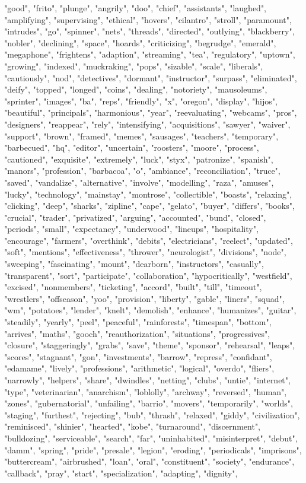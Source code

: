 "good", "frito", "plunge", "angrily", "doo", "chief", "assistants", "laughed", "amplifying", "supervising", "ethical", "hovers", "cilantro", "stroll", "paramount", "intrudes", "go", "spinner", "nets", "threads", "directed", "outlying", "blackberry", "nobler", "declining", "space", "hoards", "criticizing", "begrudge", "emerald", "megaphone", "frightens", "adaption", "streaming", "tea", "regulatory", "uptown", "growing", "indexed", "muckraking", "pops", "sizable", "scale", "liberals", "cautiously", "nod", "detectives", "dormant", "instructor", "surpass", "eliminated", "deify", "topped", "longed", "coins", "dealing", "notoriety", "mausoleums", "sprinter", "images", "ba", "reps", "friendly", "x", "oregon", "display", "hijos", "beautiful", "principals", "harmonious", "year", "reevaluating", "webcams", "pros", "designers", "reappear", "rely", "intensifying", "acquisitions", "sawyer", "waiver", "support", "brown", "framed", "memes", "sausages", "teachers", "temporary", "barbecued", "hq", "editor", "uncertain", "roosters", "moore", "process", "cautioned", "exquisite", "extremely", "luck", "styx", "patronize", "spanish", "manors", "profession", "barbacoa", "o", "ambiance", "reconciliation", "truce", "saved", "vandalize", "alternative", "involve", "modelling", "raza", "amuses", "lucky", "technology", "mainstay", "montrose", "collectible", "boasts", "relaxing", "clicking", "deep", "sharks", "zipline", "cape", "gelato", "buyer", "differs", "books", "crucial", "trader", "privatized", "arguing", "accounted", "bund", "closed", "periods", "small", "expectancy", "underwood", "lineups", "hospitality", "encourage", "farmers", "overthink", "debits", "electricians", "reelect", "updated", "soft", "mentions", "effectiveness", "thrower", "neurologist", "divisions", "node", "sweeping", "fascinating", "mount", "dearborn", "instructors", "casually", "transparent", "sort", "participate", "collaboration", "hypocritically", "westfield", "excised", "nonmembers", "ticketing", "accord", "built", "till", "timeout", "wrestlers", "offseason", "yoo", "provision", "liberty", "gable", "liners", "squad", "wm", "potatoes", "lender", "knelt", "demolish", "enhance", "humanizes", "guitar", "steadily", "yearly", "peel", "peaceful", "rainforests", "timespan", "bottom", "arrives", "maths", "gooch", "reauthorization", "situations", "progressives", "closure", "staggeringly", "grabs", "save", "theme", "sponsor", "rehearsal", "leaps", "scores", "stagnant", "gon", "investments", "barrow", "repress", "confidant", "edamame", "lively", "professions", "arithmetic", "logical", "overdo", "fliers", "narrowly", "helpers", "share", "dwindles", "netting", "clubs", "untie", "internet", "type", "veterinarian", "anarchism", "loblolly", "archway", "reversed", "human", "zones", "gubernatorial", "unfailing", "barrio", "movers", "temporarily", "worlds", "staging", "furthest", "rejecting", "bub", "thrash", "relaxed", "giddy", "civilization", "reminisced", "shinier", "hearted", "kobe", "turnaround", "discernment", "bulldozing", "serviceable", "search", "far", "uninhabited", "misinterpret", "debut", "damm", "spring", "pride", "presale", "legion", "eroding", "periodicals", "imprisons", "buttercream", "airbrushed", "loan", "oral", "constituent", "society", "endurance", "callback", "pray", "start", "specialization", "adapting", "dignity", 